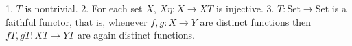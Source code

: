 1. $T$ is nontrivial.
2. For each set $X$, $X\eta: X \longrightarrow XT$ is injective.
3. $T: \text{Set} \longrightarrow \text{Set}$ is a faithful functor, that is, whenever $f, g: X \longrightarrow Y$ are distinct functions then $fT, gT: XT \longrightarrow YT$ are again distinct functions.